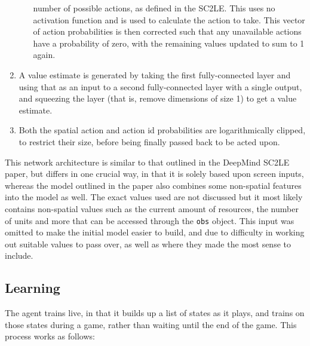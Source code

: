 \begin{enumerate}
\begin{enumerate}
            number of possible actions, as defined in the SC2LE\@. This uses no
            activation function and is used to calculate the action to take.
            This vector of action probabilities is then corrected such that any
            unavailable actions have a probability of zero, with the remaining
            values updated to sum to 1 again.
    \end{enumerate}
    \item A value estimate is generated by taking the first fully-connected
        layer and using that as an input to a second fully-connected layer with
        a single output, and squeezing the layer (that is, remove dimensions of
        size 1) to get a value estimate.
    \item Both the spatial action and action id probabilities are
        logarithmically clipped, to restrict their size, before being finally
        passed back to be acted upon.
\end{enumerate}

This network architecture is similar to that outlined in the DeepMind SC2LE
paper, but differs in one crucial way, in that it is solely based upon screen
inputs, whereas the model outlined in the paper also combines some non-spatial
features into the model as well. The exact values used are not discussed but it
most likely contains non-spatial values such as the current amount of resources,
the number of units and more that can be accessed through the \texttt{obs} object.
This input was omitted to make the initial model easier to build, and due to
difficulty in working out suitable values to pass over, as well as where they
made the most sense to include.

\subsection{Learning}

The agent trains live, in that it builds up a list of states as it plays, and
trains on those states during a game, rather than waiting until the end of the
game. This process works as follows:

